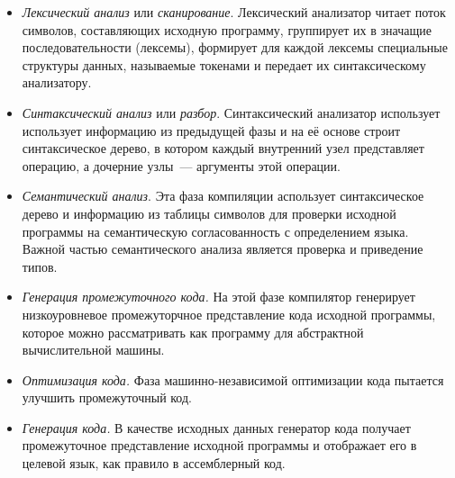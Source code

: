 \begin{itemize}
\item{\textit{Лексический анализ} или \textit{сканирование}. Лексический анализатор читает поток символов, составляющих исходную программу, группирует их в значащие последовательности (лексемы), формирует для каждой лексемы специальные структуры данных, называемые токенами и передает их синтаксическому анализатору.}	
\item{\textit{Синтаксический анализ} или \textit{разбор}. Синтаксический анализатор использует использует информацию из предыдущей фазы и на её основе строит синтаксическое дерево, в котором каждый внутренний узел представляет операцию, а дочерние узлы~--- аргументы этой операции.}	
\item{\textit{Семантический анализ}. Эта фаза компиляции аспользует синтаксическое дерево и информацию из таблицы символов для проверки исходной программы на семантическую согласованность с определением языка. Важной частью семантического анализа является проверка и приведение типов.}	
\item{\textit{Генерация промежуточного кода.} На этой фазе компилятор генерирует низкоуровневое промежуторчное представление кода исходной программы, которое можно рассматривать как программу для абстрактной вычислительной машины.}	
\item{\textit{Оптимизация кода.} Фаза машинно-независимой оптимизации кода пытается улучшить промежуточный код.}	
\item{\textit{Генерация кода.} В качестве исходных данных генератор кода получает промежуточное представление исходной программы и отображает его в целевой язык, как правило в ассемблерный код.}		
\end{itemize}

